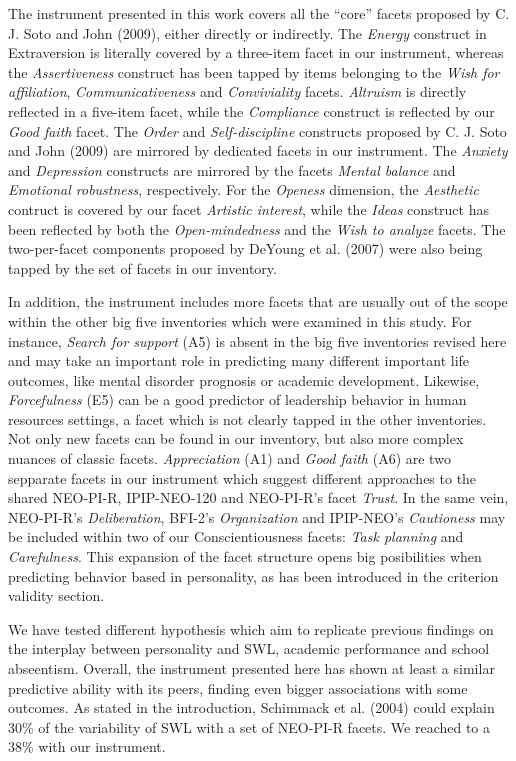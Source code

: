 \documentclass[,man,floatsintext]{apa6}
\begin{document}
The instrument presented in this work covers all the \enquote{core}
facets proposed by C. J. Soto and John (2009), either directly or
indirectly. The \emph{Energy} construct in Extraversion is literally
covered by a three-item facet in our instrument, whereas the
\emph{Assertiveness} construct has been tapped by items belonging to the
\emph{Wish for affiliation}, \emph{Communicativeness} and
\emph{Conviviality} facets. \emph{Altruism} is directly reflected in a
five-item facet, while the \emph{Compliance} construct is reflected by
our \emph{Good faith} facet. The \emph{Order} and \emph{Self-discipline}
constructs proposed by C. J. Soto and John (2009) are mirrored by
dedicated facets in our instrument. The \emph{Anxiety} and
\emph{Depression} constructs are mirrored by the facets \emph{Mental
balance} and \emph{Emotional robustness}, respectively. For the
\emph{Openess} dimension, the \emph{Aesthetic} contruct is covered by
our facet \emph{Artistic interest}, while the \emph{Ideas} construct has
been reflected by both the \emph{Open-mindedness} and the \emph{Wish to
analyze} facets. The two-per-facet components proposed by DeYoung et al.
(2007) were also being tapped by the set of facets in our inventory.

In addition, the instrument includes more facets that are usually out of
the scope within the other big five inventories which were examined in
this study. For instance, \emph{Search for support} (A5) is absent in
the big five inventories revised here and may take an important role in
predicting many different important life outcomes, like mental disorder
prognosis or academic development. Likewise, \emph{Forcefulness} (E5)
can be a good predictor of leadership behavior in human resources
settings, a facet which is not clearly tapped in the other inventories.
Not only new facets can be found in our inventory, but also more complex
nuances of classic facets. \emph{Appreciation} (A1) and \emph{Good
faith} (A6) are two sepparate facets in our instrument which suggest
different approaches to the shared NEO-PI-R, IPIP-NEO-120 and NEO-PI-R's
facet \emph{Trust}. In the same vein, NEO-PI-R's \emph{Deliberation},
BFI-2's \emph{Organization} and IPIP-NEO's \emph{Cautioness} may be
included within two of our Conscientiousness facets: \emph{Task
planning} and \emph{Carefulness}. This expansion of the facet structure
opens big posibilities when predicting behavior based in personality, as
has been introduced in the criterion validity section.

We have tested different hypothesis which aim to replicate previous
findings on the interplay between personality and SWL, academic
performance and school abseentism. Overall, the instrument presented
here has shown at least a similar predictive ability with its peers,
finding even bigger associations with some outcomes. As stated in the
introduction, Schimmack et al. (2004) could explain 30\% of the
variability of SWL with a set of NEO-PI-R facets. We reached to a 38\%
with our instrument.
\end{document}
